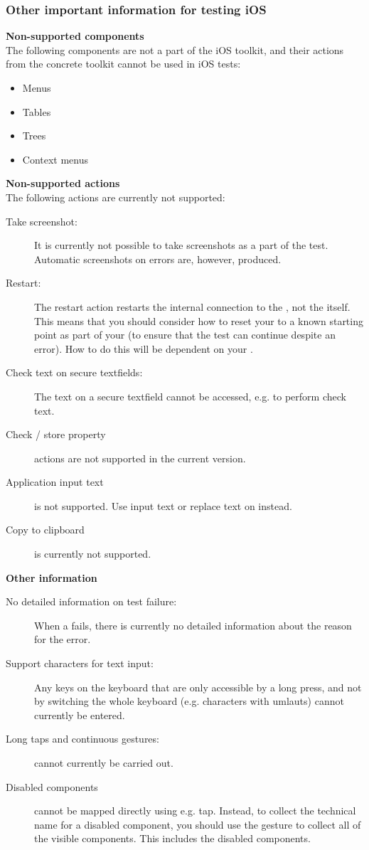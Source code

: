 \subsubsection{Other important information for testing iOS \gdauts{}}
\textbf{Non-supported components}\\
The following components are not a part of the iOS toolkit, and their actions from the concrete toolkit cannot be used in iOS tests:
\begin{itemize}
\item Menus
\item Tables
\item Trees
\item Context menus
\end{itemize}

\textbf{Non-supported actions}\\
The following actions are currently not supported:
\begin{description}
\item [Take screenshot:]{It is currently not possible to take screenshots as a part of the test. Automatic screenshots on errors are, however, produced.}
\item [Restart:]{The restart action restarts the internal connection to the \gdaut{}, not the \gdaut{} itself. This means that you should consider how to reset your \gdaut{} to a known starting point as part of your \gdehandlers{} (to ensure that the test can continue despite an error). How to do this will be dependent on your \gdaut{}.}
\item [Check text on secure textfields:]{The text on a secure textfield cannot be accessed, e.g. to perform check text.}
\item [Check / store property]{ actions are not supported in the current version.}
\item [Application input text]{ is not supported. Use input text or replace text on  instead.}
\item [Copy to clipboard]{ is currently not supported.}
\end{description}

\textbf{Other information}\\
\begin{description}
\item [No detailed information on test failure:]{When a \gdstep{} fails, there is currently no detailed information about the reason for the error.}
\item [Support characters for text input:]{Any keys on the keyboard that are only accessible by a long press, and not by switching the whole keyboard (e.g. characters with umlauts) cannot currently be entered.}
\item [Long taps and continuous gestures:]{cannot currently be carried out.}
\item [Disabled components]{ cannot be mapped directly using e.g. tap. Instead, to collect the technical name for a disabled component, you should use the  gesture to collect all of the visible components. This includes the disabled components. }
\end{description}






